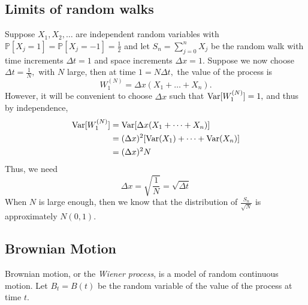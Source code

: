 \documentclass[oneside]{book}
\newcommand{\bbP}{\mathbb{P}}
\begin{document}
\subsection{Limits of random walks}
Suppose $X_1, X_2, \dots$ are independent random variables with $\bbP[X_j = 1] = \bbP[X_j = -1] = \frac{1}{2}$ and let $S_n = \displaystyle\sum_{j=0}^nX_j$ be the random walk with time increments $\Delta t = 1$ and space increments $\Delta x = 1.$ \newline\newline Suppose we now choose $\Delta t = \frac{1}{N},$ with $N$ large, then at time $1 = N  \Delta t,$ the value of the process is 
\[W_1^{(N)} = \Delta x(X_1 + \dots + X_n).\] However, it will be convenient to choose $\Delta x$ such that $\text{Var}[W_1^{(N)}] = 1,$ and thus by independence, 
\begin{align*}
    \text{Var}[W_1^{(N)}] &= \text{Var}[\Delta x(X_1 + \dots + X_n)]\\
    &= (\Delta x)^2[\text{Var}(X_1) + \dots + \text{Var}(X_n)]\\
    &= (\Delta x)^2 N
\end{align*}
Thus, we need \[\Delta x = \sqrt{\frac{1}{N}} = \sqrt{\Delta t}\] When $N$ is large enough, then we know that the distribution of $\frac{S_n}{\sqrt{N}}$ is approximately $N(0,1).$

\subsection{Brownian Motion}
Brownian motion, or the \textit{Wiener process}, is a model of random continuous motion. Let $B_t = B(t)$ be the random variable  of the value of the process at time $t.$ 
\end{document}
